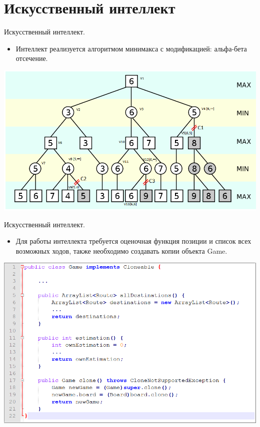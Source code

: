 \documentclass[11pt,slides,aspectratio=43]{beamer}
\begin{document}
    \section{Искусственный интеллект}

    \begin{frame}{Искусственный интеллект.}
		\begin{itemize}
	           \item Интеллект реализуется алгоритмом минимакса с модификацией: альфа-бета отсечение.
        \end{itemize}
        \begin{center}
			     \includegraphics[scale=0.33]{tree.png}
		\end{center}
	\end{frame}

    \begin{frame}{Искусственный интеллект.}
		\begin{itemize}
               \item Для работы интеллекта требуется оценочная функция позиции и список всех возможных ходов, также необходимо создавать копии объекта Game.
        \end{itemize}
        \begin{center}
			     \includegraphics[scale=0.33]{gameAI.png}
		\end{center}
	\end{frame}
	
\end{document}

